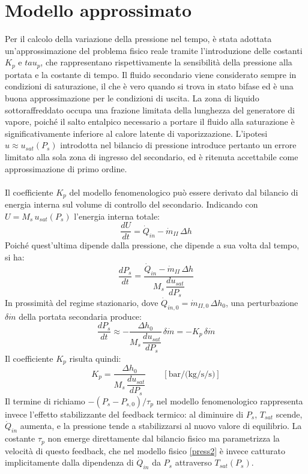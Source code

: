 \documentclass[12pt]{report}
\begin{document}
\section{Modello approssimato}
Per il calcolo della variazione della pressione nel tempo, è stata adottata un'approssimazione del problema fisico reale tramite l'introduzione delle costanti $K_p$ e $tau_p$, che rappresentano rispettivamente la sensibilità della pressione alla portata e la costante di tempo. Il fluido secondario viene considerato sempre in condizioni di saturazione, il che è vero quando si trova in stato bifase ed è una buona approssimazione per le condizioni di uscita. La zona di liquido sottoraffreddato occupa una frazione limitata della lunghezza del generatore di vapore, poiché il salto entalpico necessario a portare il fluido alla saturazione è significativamente inferiore al calore latente di vaporizzazione. L'ipotesi $u \approx u_{sat}(P_s)$ introdotta nel bilancio di pressione introduce pertanto un errore limitato alla sola zona di ingresso del secondario, ed è ritenuta accettabile come approssimazione di primo ordine.\\ \\Il coefficiente $K_p$ del modello fenomenologico può essere derivato dal bilancio di energia interna sul volume di controllo del secondario. Indicando con $U = M_s\,u_{sat}(P_s)$ l'energia interna totale:
\begin{equation}
    \frac{dU}{dt} = \dot{Q}_{in} - \dot{m}_{II}\,\Delta h
\end{equation}
Poiché quest'ultima dipende dalla pressione, che dipende a sua volta dal tempo, si ha:
\begin{equation}
    \frac{dP_s}{dt} = \frac{\dot{Q}_{in} - \dot{m}_{II}\,\Delta h}
                           {M_s\,\dfrac{du_{sat}}{dP_s}}
    \label{eq:dPdt_fisica}
\end{equation}
In prossimità del regime stazionario, dove $\dot{Q}_{in,0} = \dot{m}_{II,0}\,\Delta h_0$, una perturbazione $\delta\dot{m}$ della portata secondaria produce:
\begin{equation}
    \frac{dP_s}{dt} \approx -\frac{\Delta h_0}{M_s\,\dfrac{du_{sat}}{dP_s}}
    \,\delta\dot{m} = -K_p\,\delta\dot{m}
\end{equation}
Il coefficiente $K_p$ risulta quindi:
\begin{equation}
    K_p = \frac{\Delta h_0}{M_s\,\dfrac{du_{sat}}{dP_s}}
    \qquad \left[\si{\bar\per(\kilogram\per\second\per\second)}\right]
\end{equation}
Il termine di richiamo $-(P_s - P_{s,0})/\tau_p$ nel modello fenomenologico rappresenta invece l'effetto stabilizzante del feedback termico: al diminuire di $P_s$, $T_{sat}$ scende, $\dot{Q}_{in}$ aumenta, e la pressione tende a stabilizzarsi al nuovo valore di equilibrio. La costante $\tau_p$ non emerge direttamente dal bilancio fisico ma parametrizza la velocità di questo feedback, che nel modello fisico \eqref{press2} è invece catturato implicitamente dalla dipendenza di $\dot{Q}_{in}$ da $P_s$ attraverso $T_{sat}(P_s)$.
\end{document}
